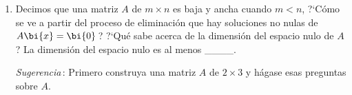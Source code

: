 \begin{enumerate}
%
\vspace{-9pt}
Sea $A=\left[\begin{array}{@{\,}rr@{\,}}\bi{1}&\bi{3}\\\bi{2}&\bi{4}\\\end{array}\right]$\,. Aplique pivoteo completo para producir $P_1AP_2=LU$.


\vspace{5pt}


\item Decimos que una matriz $A$ de $m\times n$  es baja y ancha cuando $m<n$, ?`C\'omo se ve a partir del proceso de eliminaci\'on que hay soluciones no nulas de  $A\bi{x}=\bi{0}$\,? ?`Qu\'e sabe acerca de la dimensi\'on del espacio nulo de $A$? La dimensi\'on del espacio nulo es al menos \_\_\_\_.



\emph{Sugerencia}\,: Primero construya una matriz $A$ de $2 \times 3$ y h\'agase esas preguntas sobre $A$.

\end{enumerate}